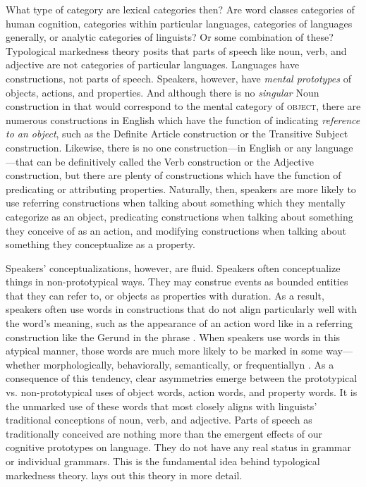 What type of category are lexical categories then? Are word classes categories of human cognition, categories within particular languages, categories of languages generally, or analytic categories of linguists? Or some combination of these? Typological markedness theory posits that parts of speech like noun, verb, and adjective are not categories of particular languages. Languages have constructions, not parts of speech. Speakers, however, have \emph{mental prototypes} of objects, actions, and properties. And although there is no \emph{singular} Noun construction in  that would correspond to the mental category of \textsc{object}, there are numerous constructions in English which have the function of indicating \emph{reference to an object}, such as the Definite Article construction or the Transitive Subject construction. Likewise, there is no one construction—in English or any language—that can be definitively called the Verb construction or the Adjective construction, but there are plenty of constructions which have the function of predicating or attributing properties. Naturally, then, speakers are more likely to use referring constructions when talking about something which they mentally categorize as an object, predicating constructions when talking about something they conceive of as an action, and modifying constructions when talking about something they conceptualize as a property.

Speakers' conceptualizations, however, are fluid. Speakers often conceptualize things in non-prototypical ways. They may construe events as bounded entities that they can refer to, or objects as properties with duration. As a result, speakers often use words in constructions that do not align particularly well with the word's meaning, such as the appearance of an action word like  in a referring construction like the Gerund in the phrase . When speakers use words in this atypical manner, those words are much more likely to be marked in some way—whether morphologically, behaviorally, semantically, or frequentiallyn \parencite[§2.2]{Croft1991}. As a consequence of this tendency, clear asymmetries emerge between the prototypical vs. non-prototypical uses of object words, action words, and property words. It is the unmarked use of these words that most closely aligns with linguists' traditional conceptions of noun, verb, and adjective. Parts of speech as traditionally conceived are nothing more than the emergent effects of our cognitive prototypes on language. They do not have any real status in grammar or individual grammars. This is the fundamental idea behind typological markedness theory.  lays out this theory in more detail.

